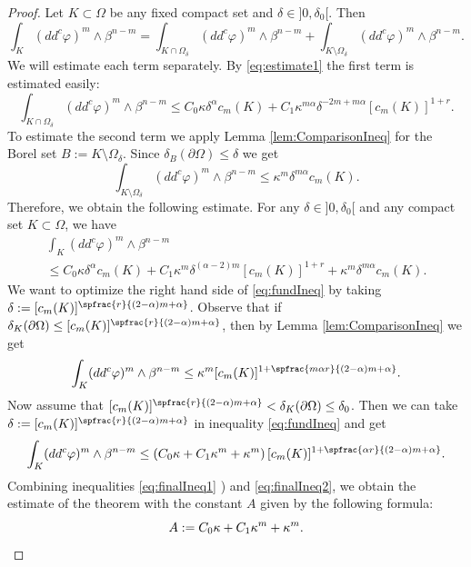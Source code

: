 \begin{proof}
Let $K \subset \Omega$ be any fixed compact set and $\delta\in{}]0,\delta_0[$. Then
\[
\int_K (dd^c\varphi)^m\wedge\beta^{n-m} = \int_{K \cap \Omega_\delta} (dd^c\varphi)^m\wedge\beta^{n-m} + \int_{K \setminus \Omega_\delta} (dd^c\varphi)^m\wedge\beta^{n-m}.
\]
We will estimate each term separately. By \eqref{eq:estimate1} the first term is estimated easily:
\[
\int_{K \cap \Omega_\delta} (dd^c\varphi)^m\wedge\beta^{n-m} \leq C_0 \kappa \delta^{\alpha} c_m (K) + C_1 \kappa^{m \alpha}\delta^{-2m + m \alpha} [c_m(K)]^{1+ r}.
\]
To estimate the second term we apply Lemma \ref{lem:ComparisonIneq} for the Borel set $ B:= K \setminus \Omega_\delta$. Since $\delta_B (\partial \Omega) \leq \delta$ we get
\[
\int_{K \setminus \Omega_\delta} (dd^c\varphi)^m\wedge\beta^{n-m} \leq \kappa^m \delta^{m \alpha} c_m (K).
\]
Therefore, we obtain the following estimate. For any $\delta\in{}]0,\delta_0[$ and any compact set $K \subset \Omega$, we have
\begin{multline} \label{eq:fundIneq}
\int_{K}(dd^c\varphi)^m\wedge\beta^{n-m}\\[-5pt]
\leq C_0 \kappa \delta^{\alpha} c_m (K) + C_1 \kappa^m \delta^{(\alpha -2) m } [c_m(K)]^{1+ r} + \kappa^m \delta^{m \alpha} c_m (K).
\end{multline}
We want to optimize the right hand side of \eqref{eq:fundIneq} by taking $\delta:= [c_m (K)]^{\spfrac{r}{(2-\alpha) m + \alpha}}$. Observe that if $ \delta_K(\partial \Omega) \leq [c_m (K)]^{\spfrac{r}{(2-\alpha) m + \alpha}}$, then by Lemma \ref{lem:ComparisonIneq} we get
\begin{equation} \label{eq:finalIneq1}
\int_{K}(dd^c\varphi)^m\wedge\beta^{n-m} \leq \kappa^m [c_m (K)]^{1 + \spfrac{m \alpha r}{(2-\alpha) m + \alpha}}.
\end{equation}
Now assume that $ [c_m (K)]^{\spfrac{r}{(2-\alpha) m + \alpha}} < \delta_K (\partial \Omega) \leq \delta_0$. Then we can take $\delta:= [c_m (K)]^{\spfrac{r}{(2-\alpha) m + \alpha}}$ in inequality \eqref{eq:fundIneq} and get
\begin{equation}\label{eq:finalIneq2}
\int_{K}(dd^c\varphi)^m\wedge\beta^{n-m} \leq (C_0 \kappa + C_1 \kappa^m + \kappa^m) \, [c_m (K)]^{1 + \spfrac{\alpha r}{(2-\alpha) m + \alpha}}.
\end{equation}
Combining inequalities \eqref{eq:finalIneq1} ) and \eqref{eq:finalIneq2}, we obtain the estimate of the theorem with the constant $A$ given by the following formula:
\begin{equation} \label{eq:finalConst}
A:= C_0 \kappa + C_1 \kappa^m + \kappa^m.\qedhere
\end{equation}
\end{proof}

